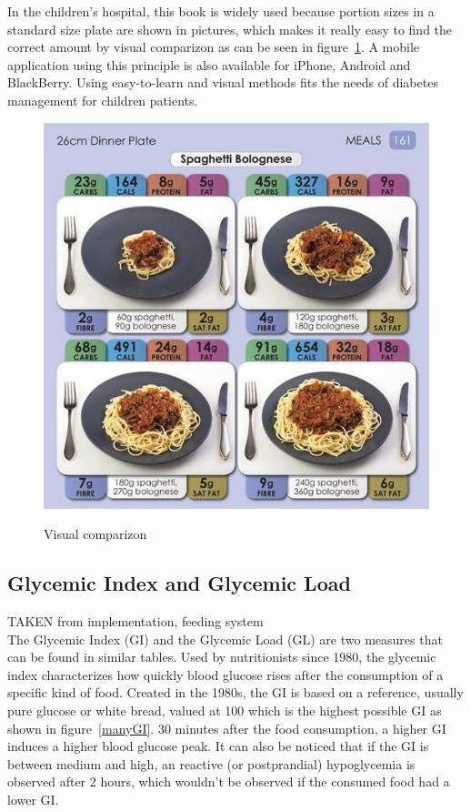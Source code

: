 In the children's hospital, this book is widely used because portion sizes in a standard size plate are shown in pictures, which makes it really easy to find the correct amount by visual comparizon as can be seen in figure~\ref{fig:bookImage}. A mobile application using this principle is also available for iPhone, Android and BlackBerry. Using easy-to-learn and visual methods fits the needs of diabetes management for children patients.
\begin{figure}[h]
  \centering
  \caption{Visual comparizon}
  \includegraphics[scale=1.2]{bookImage.jpg}
  \label{fig:bookImage}
\end{figure}

\subsection{Glycemic Index and Glycemic Load}
TAKEN from implementation, feeding system\\
The Glycemic Index (GI) and the Glycemic Load (GL) are two measures %
that can be found in similar tables. Used by nutritionists since 1980, the glycemic index characterizes how quickly blood glucose rises after the consumption of a specific kind of food. 
Created in the 1980s, the GI is based on a reference, usually pure glucose or white bread, valued at 100 which is the highest possible GI as shown in figure~\ref{manyGI}. 30 minutes after the food consumption, a higher GI induces a higher blood glucose peak. It can also be noticed that if the GI is between medium and high, an reactive (or postprandial) hypoglycemia is observed after 2 hours, which wouldn't be observed if the consumed food had a lower GI.

